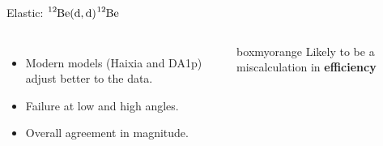 \documentclass[sans,
frameno, %
mp,
usenames,dvipsnames, %
onlytextwidth, %
t,%
11pt]{beamer}
\newcommand{\iso}[2]{\ce{^{#1}#2}}
\begin{document}
\begin{frame}{Elastic: $\iso{12}{Be}(\textrm{d}, \textrm{d})\iso{12}{Be}$}
{\begin{figure}
\begin{minipage}[t]{0.48\linewidth}
            \end{minipage}
        \end{figure}
        \begin{columns}
            {
                \begin{itemize}
                    \item Modern models (Haixia and DA1p) adjust better to the data.
                    \item Failure at low and high angles.
                    \item Overall agreement in magnitude.
                \end{itemize}
            }\hfill
            {

                \begin{beamercolorbox}[sep=1ex, center, rounded=true]{boxmyorange}
                    Likely to be a miscalculation in \textbf{efficiency}
                \end{beamercolorbox}

}
\end{columns}}
\end{frame}
\end{document}
